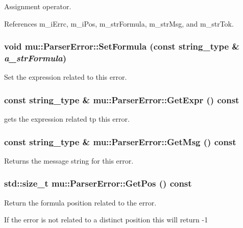 Assignment operator. 



References m\_\-iErrc, m\_\-iPos, m\_\-strFormula, m\_\-strMsg, and m\_\-strTok.
\subsubsection[SetFormula]{\setlength{\rightskip}{0pt plus 5cm}void mu::ParserError::SetFormula (const {\bf string\_\-type} \& {\em a\_\-strFormula})}\label{classmu_1_1ParserError_1b7b4b511525f13f728c9c2942983b19}


Set the expression related to this error. 

\subsubsection[GetExpr]{\setlength{\rightskip}{0pt plus 5cm}const {\bf string\_\-type} \& mu::ParserError::GetExpr () const}\label{classmu_1_1ParserError_845ae0a3276f1f0326c6b9f4d946bcbf}


gets the expression related tp this error. 

\subsubsection[GetMsg]{\setlength{\rightskip}{0pt plus 5cm}const {\bf string\_\-type} \& mu::ParserError::GetMsg () const}\label{classmu_1_1ParserError_f03a4eb049e106be1dbc957ab4c90ee8}


Returns the message string for this error. 

\subsubsection[GetPos]{\setlength{\rightskip}{0pt plus 5cm}std::size\_\-t mu::ParserError::GetPos () const}\label{classmu_1_1ParserError_38fa45df3312a8258b58fa0b25550618}


Return the formula position related to the error. 

If the error is not related to a distinct position this will return -1 
